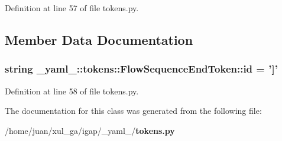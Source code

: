 Definition at line 57 of file tokens.py.

\subsection{Member Data Documentation}
\subsubsection{\setlength{\rightskip}{0pt plus 5cm}string {\bf \_\-yaml\_\-::tokens::FlowSequenceEndToken::id} = ']'\hspace{0.3cm}{\tt  [static]}}\label{class__yaml___1_1tokens_1_1FlowSequenceEndToken_619a2d3d9b4c31afabaa8e150a3dcb92}




Definition at line 58 of file tokens.py.

The documentation for this class was generated from the following file:\begin{CompactItemize}
\item 
/home/juan/xul\_\-ga/igap/\_\-yaml\_\-/{\bf tokens.py}\end{CompactItemize}
